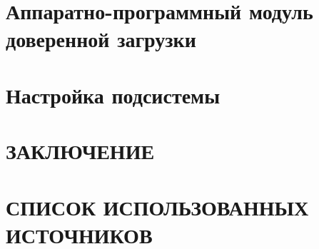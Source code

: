 \documentclass[spec, och, pract, times]{shiza}
\begin{document}

\tableofcontents

\intro


\section{Аппаратно-программный модуль доверенной загрузки}


\section{Настройка подсистемы}




\section{ЗАКЛЮЧЕНИЕ}


\section{СПИСОК ИСПОЛЬЗОВАННЫХ ИСТОЧНИКОВ}
% 
% 
\end{document}
